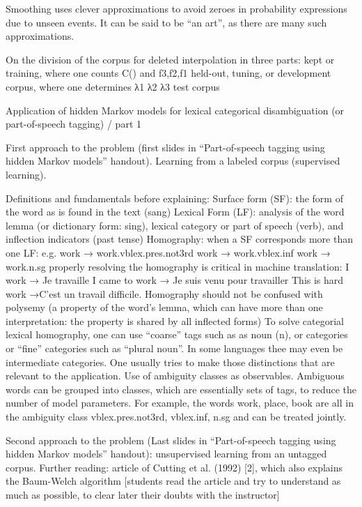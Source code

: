 Smoothing uses clever approximations to avoid zeroes in probability expressions due to unseen events. It can be said to be “an art”, as there are many such approximations.

On the division of the corpus for deleted interpolation in three parts:
kept or training, where one counts 	C() and  f3,f2,f1
held-out, tuning, or development corpus, where one determines λ1 λ2 λ3
test corpus


Application of hidden Markov models for lexical categorical disambiguation (or part-of-speech tagging) / part 1

First approach to the problem (first slides in “Part-of-speech tagging using hidden Markov models” handout). Learning from a labeled corpus (supervised learning).

Definitions and fundamentals before explaining:
Surface form (SF): the form of the word as is found in the text (sang)
Lexical Form (LF): analysis of the word 
lemma (or dictionary form: sing), 
lexical category or part of speech (verb), and 
inflection indicators (past tense)
Homography: when a SF corresponds more than one LF: e.g.
work → work.vblex.pres.not3rd
work → work.vblex.inf
work → work.n.sg 
properly resolving the homography is critical in machine translation:
I work → Je travaille
I came to work → Je suis venu pour travailler
This is hard work →C’est un travail difficile.
Homography should not be confused with polysemy (a property of the word’s lemma, which can have more than one interpretation: the property is shared by all inflected forms)
To solve categorial lexical homography, one can use “coarse” tags such as as noun (n), or categories or “fine” categories such as “plural noun”. In some languages thee may even be intermediate categories. One usually tries to make those distinctions that are relevant to the application.
Use of ambiguity classes as observables. Ambiguous words can be grouped into  classes, which are essentially sets of tags, to reduce the number of model parameters. For example, the words work, place, book are all in the ambiguity class {vblex.pres.not3rd, vblex.inf, n.sg} and can be treated jointly.

Second approach to the problem (Last slides in “Part-of-speech tagging using hidden Markov models” handout): unsupervised learning from an untagged corpus. Further reading: article of Cutting et al. (1992) [2], which also explains the Baum-Welch algorithm [students read the article and try to understand as much as possible, to clear later their doubts with the instructor]





